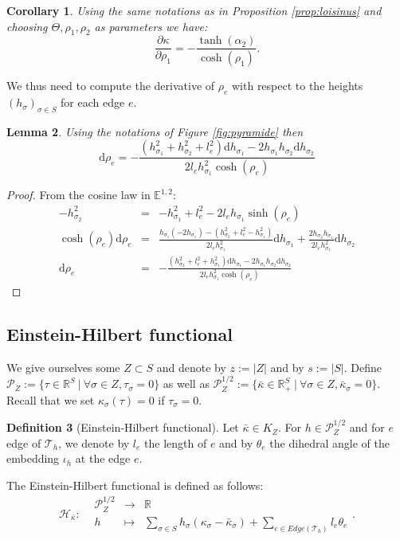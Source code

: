 \documentclass[a4paper,12pt]{article}
\def\TT{\mathcal T}
\def\adm{\P}
\def\d{\mathrm{d}}
\def\RR{\mathbb{R}}
\newcommand{\mass}[1]{{\mathbb E}^{1,2}_{#1}}
\def\d{\mathrm{d}}
\def\adm{\mathcal{P}}
\def\P{\mathcal{P}}
\newcommand{\function}[5]{\displaystyle#1:\begin{array}{l|rcl}
& \displaystyle #2 & \longrightarrow & \displaystyle #3 \\
	& \displaystyle #4 & \longmapsto & \displaystyle #5 \end{array}}
\newtheorem{lem}{Lemma}[section]		 %
\newtheorem{cor}[lem]{Corollary}
\theoremstyle{definition}
\newtheorem{defi}[lem]{Definition}	%
\begin{document}
					\begin{cor} \label{cor:drapeau}
						Using the same notations as in Proposition \ref{prop:loisinus} and choosing 
						 $\Theta,\rho_1,\rho_2$ as parameters we have:
							$$\frac{\partial \kappa}{\partial \rho_1} = -\frac{\tanh(\alpha_2)}{\cosh(\rho_1)}.$$
					\end{cor}
					


					
					We thus need to compute the derivative of $\rho_e$ with respect to the heights $(h_\sigma)_{\sigma\in S}$ for each edge $e$.
					\begin{lem}
					Using the notations of Figure \ref{fig:pyramide} then
					$$\d \rho_{e} = - \frac{(h_{\sigma_1}^2+h_{\sigma_2}^2+l_e^2)\d h_{\sigma_1} - 2 h_{\sigma_1} h_{\sigma_2} \d h_{\sigma_2} }{2 l_e h_{\sigma_1}^2\cosh(\rho_{e})}$$

					\end{lem}
					\begin{proof}
					From the cosine law in $\mass{}$:
					\begin{eqnarray*} -h_{\sigma_2}^2 &=&-h_{\sigma_1}^2+l_e^2 - 2 l_e h_{\sigma_1} \sinh(\rho_e) \\
					\cosh(\rho_e)\d \rho_e &=& \frac{h_{\sigma_1}(-2h_{\sigma_1})-(h_{\sigma_2}^2+l_e^2-h_{\sigma_1}^2)}{2l_eh_{\sigma_1}^2} \d h_{\sigma_1} + \frac{2 h_{\sigma_2} h_{\sigma_1}}{2 l_e h_{\sigma_1}^2} \d h_{\sigma_2} \\
					\d \rho_e&=&- \frac{(h_{\sigma_2}^2+l_e^2 + h_{\sigma_1}^2)\d h_{\sigma_1} - 2 h_{\sigma_1} h_{\sigma_2} \d h_{\sigma_2} }{2 l_e h_{\sigma_1}^2\cosh(\rho_e)}
					\end{eqnarray*}
					\end{proof}

				\subsection{Einstein-Hilbert functional}
				
			
				 We give ourselves some $Z\subset S$ and denote by $z:=|Z|$ and by $s:=|S|$. Define $\adm_Z:= \{\tau \in \RR^S ~|~\forall \sigma\in Z,\tau_\sigma=0\}$ as well as $\adm_Z^{1/2}:= \{\bar\kappa \in \RR_+^S~|~ \forall \sigma\in Z,\bar\kappa_\sigma = 0\}$. Recall that we set $\kappa_\sigma(\tau)=0$ if $\tau_\sigma=0$.
				\begin{defi}[Einstein-Hilbert functional]

						Let $\bar\kappa \in K_Z $.
						For $h\in \adm^{1/2}_Z$ and for $e$ edge of $\TT_h$, we denote by
						$l_e$ the length of $e$ and by $\theta_e$ the dihedral angle of the embedding $\iota_h$ at the edge $e$.

	 					The Einstein-Hilbert functional is defined as follows:
						 $$\function{\mathcal{H}_{\bar\kappa}}{\adm_Z^{1/2}}{\RR}{h}{\sum_{\sigma \in S} h_\sigma (\kappa_\sigma - \bar \kappa_\sigma)+ \sum_{e \in Edge(\TT_h)} l_e\theta_e}.$$
				\end{defi}
                    
\end{document}
